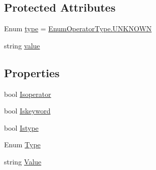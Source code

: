 \subsection*{Protected Attributes}
\begin{DoxyCompactItemize}
\item 
Enum \hyperlink{class_c_p_u___o_s___simulator_1_1_compiler_1_1_frontend_1_1_tokens_1_1_token_a7ec4dbbde477cd373f8135f0c843a346}{type} = \hyperlink{namespace_c_p_u___o_s___simulator_1_1_compiler_1_1_frontend_1_1_tokens_a86b87efebad08200cebe3075b5812b13a696b031073e74bf2cb98e5ef201d4aa3}{Enum\+Operator\+Type.\+U\+N\+K\+N\+O\+W\+N}
\item 
string \hyperlink{class_c_p_u___o_s___simulator_1_1_compiler_1_1_frontend_1_1_tokens_1_1_token_a5c05e12850ca18be8cbfdf7e2e263324}{value}
\end{DoxyCompactItemize}
\subsection*{Properties}
\begin{DoxyCompactItemize}
\item 
bool \hyperlink{class_c_p_u___o_s___simulator_1_1_compiler_1_1_frontend_1_1_tokens_1_1_token_a8da0567c03fd25e1494ddbe098f95405}{Isoperator}
\item 
bool \hyperlink{class_c_p_u___o_s___simulator_1_1_compiler_1_1_frontend_1_1_tokens_1_1_token_a584165252fdb4f576e49466e2de55502}{Iskeyword}
\item 
bool \hyperlink{class_c_p_u___o_s___simulator_1_1_compiler_1_1_frontend_1_1_tokens_1_1_token_a61b9eeb8f47e957789390a188f65a08b}{Istype}
\item 
Enum \hyperlink{class_c_p_u___o_s___simulator_1_1_compiler_1_1_frontend_1_1_tokens_1_1_token_a1735d21dd74ca2022d60b7ca45be3040}{Type}
\item 
string \hyperlink{class_c_p_u___o_s___simulator_1_1_compiler_1_1_frontend_1_1_tokens_1_1_token_ac2869f45f5d24226d03406c3f9da0505}{Value}
\end{DoxyCompactItemize}
